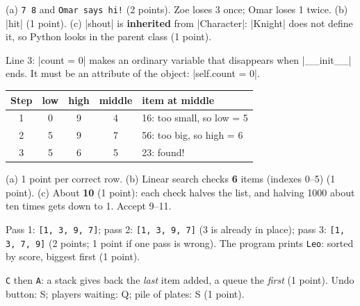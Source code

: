 \begin{answer}
(a) \texttt{7 8} and \texttt{Omar says hi!} (2 points). Zoe loses 3 once; Omar loses 1 twice.
(b) \py|hit| (1 point). (c) \py|shout| is \textbf{inherited} from \py|Character|: \py|Knight|
does not define it, so Python looks in the parent class (1 point).
\end{answer}

\begin{answer}
Line 3: \py|count = 0| makes an ordinary variable that disappears when \py|__init__| ends. It must
be an attribute of the object: \py|self.count = 0|.
\end{answer}

\begin{answer}
\begin{center}
\renewcommand{\arraystretch}{1.3}
\begin{tabular}{|c|c|c|c|l|}
\hline
\textbf{Step} & \textbf{low} & \textbf{high} & \textbf{middle} & \textbf{item at middle}\\ \hline
1 & 0 & 9 & 4 & 16: too small, so low = 5\\ \hline
2 & 5 & 9 & 7 & 56: too big, so high = 6\\ \hline
3 & 5 & 6 & 5 & 23: found!\\ \hline
\end{tabular}
\end{center}
(a) 1 point per correct row. (b) Linear search checks \textbf{6} items (indexes 0--5) (1 point).
(c) About \textbf{10} (1 point): each check halves the list, and halving 1000 about ten times gets
down to 1. Accept 9--11.
\end{answer}

\begin{answer}
Pass 1: \texttt{[1, 3, 9, 7]}; pass 2: \texttt{[1, 3, 9, 7]} (3 is already in place);
pass 3: \texttt{[1, 3, 7, 9]} (2 points; 1 point if one pass is wrong). The program prints
\texttt{Leo}: sorted by score, biggest first (1 point).
\end{answer}

\begin{answer}
\texttt{C} then \texttt{A}: a stack gives back the \emph{last} item added, a queue the
\emph{first} (1 point). Undo button: S; players waiting: Q; pile of plates: S (1 point).
\end{answer}


